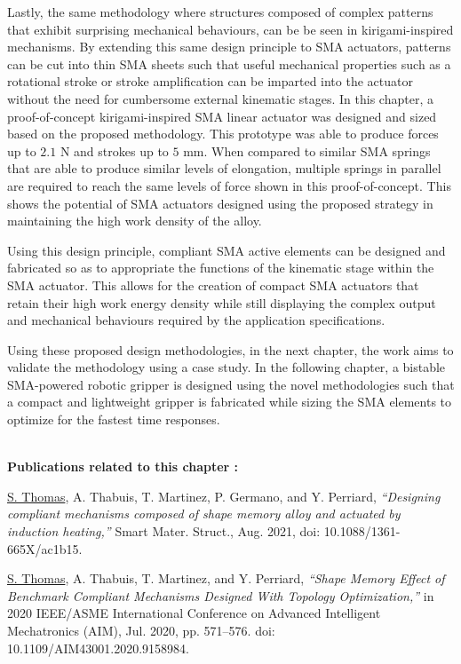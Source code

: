 Lastly, the same methodology where structures composed of complex patterns that exhibit surprising mechanical behaviours, can be be seen in kirigami-inspired mechanisms. By extending this same design principle to SMA actuators, patterns can be cut into thin SMA sheets such that useful mechanical properties such as a rotational stroke or stroke amplification can be imparted into the actuator without the need for cumbersome external kinematic stages. In this chapter, a proof-of-concept kirigami-inspired SMA linear actuator was designed and sized based on the proposed methodology. This prototype was able to produce forces up to $2.1$ N and strokes up to $5$ mm. When compared to similar SMA springs that are able to produce similar levels of elongation, multiple springs in parallel are required to reach the same levels of force shown in this proof-of-concept. This shows the potential of SMA actuators designed using the proposed strategy in maintaining the high work density of the alloy.

Using this design principle, compliant SMA active elements can be designed and fabricated so as to appropriate the functions of the kinematic stage within the SMA actuator. This allows for the creation of compact SMA actuators that retain their high work energy density while still displaying the complex output and mechanical behaviours required by the application specifications.

Using these proposed design methodologies, in the next chapter, the work aims to validate the methodology using a case study. In the following chapter, a bistable SMA-powered robotic gripper is designed using the novel methodologies such that a compact and lightweight gripper is fabricated while sizing the SMA elements to optimize for the fastest time responses.

\vspace*{\fill}
\noindent\hrulefill \\
\textbf{\large Publications related to this chapter :}

\underline{S. Thomas}, A. Thabuis, T. Martinez, P. Germano, and Y. Perriard, \textit{“Designing compliant mechanisms composed of shape memory alloy and actuated by induction heating,”} Smart Mater. Struct., Aug. 2021, doi: 10.1088/1361-665X/ac1b15.

\underline{S. Thomas}, A. Thabuis, T. Martinez, and Y. Perriard, \textit{“Shape Memory Effect of Benchmark Compliant Mechanisms Designed With Topology Optimization,”} in 2020 IEEE/ASME International Conference on Advanced Intelligent Mechatronics (AIM), Jul. 2020, pp. 571–576. doi: 10.1109/AIM43001.2020.9158984.

